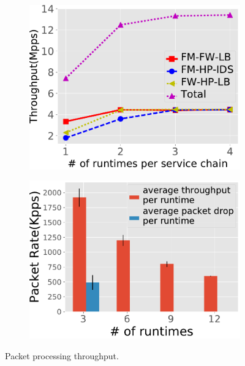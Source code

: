 \begin{figure}[!t]
 \begin{subfigure}[t]{0.475\linewidth}
   \centering
   \includegraphics[width=\columnwidth]{figure/revised-throughput-test.pdf}
   \caption{}\label{fig:normal-case-eval} \end{subfigure}\hfill
  \begin{subfigure}[t]{0.505\linewidth}
   \centering
   \includegraphics[width=\columnwidth]{figure/Mixtest.pdf}
   \caption{}\label{fig:mix-work-flow}
  \end{subfigure}
\caption{ Packet processing throughput.} %
\label{fig:mig-perf}
\end{figure}



